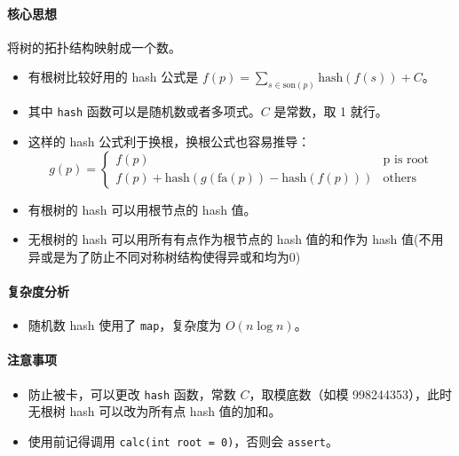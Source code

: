 \paragraph{核心思想}
将树的拓扑结构映射成一个数。

\begin{itemize}
    \item 有根树比较好用的 hash 公式是 $f(p) = \sum_{s \in \text{son}(p)} \text{hash}(f(s)) + C$。
    \item 其中 \texttt{hash} 函数可以是随机数或者多项式。$C$ 是常数，取 1 就行。
    \item 这样的 hash 公式利于换根，换根公式也容易推导：
    \[
    g(p) = 
    \begin{cases} 
        f(p) & \text{p is root} \\ 
        f(p) + \text{hash}(g(\text{fa}(p)) - \text{hash}(f(p))) & \text{others} 
    \end{cases}
    \]
    \item 有根树的 hash 可以用根节点的 hash 值。
    \item 无根树的 hash 可以用所有有点作为根节点的 hash 值的和作为 hash 值(不用异或是为了防止不同对称树结构使得异或和均为0)
\end{itemize}

\paragraph{复杂度分析}
\begin{itemize}[leftmargin=*]
    \item 随机数 hash 使用了 \texttt{map}，复杂度为 $O(n \log n)$。
\end{itemize}

\paragraph{注意事项}
\begin{itemize}[leftmargin=*]
    \item 防止被卡，可以更改 \texttt{hash} 函数，常数 $C$，取模底数（如模 998244353），此时无根树 hash 可以改为所有点 hash 值的加和。
    \item 使用前记得调用 \texttt{calc(int root = 0)}，否则会 \texttt{assert}。
\end{itemize}
